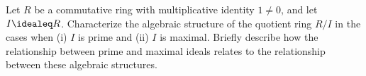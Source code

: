 %
%

\noindent{}Let $R$ be a commutative ring with multiplicative identity $1 \neq 0$, and let $I \idealeq R$. Characterize the algebraic structure of the quotient ring $R / I$ in the cases when (i) $I$ is prime and (ii) $I$ is maximal. Briefly describe how the relationship between prime and maximal ideals relates to the relationship between these algebraic structures.

